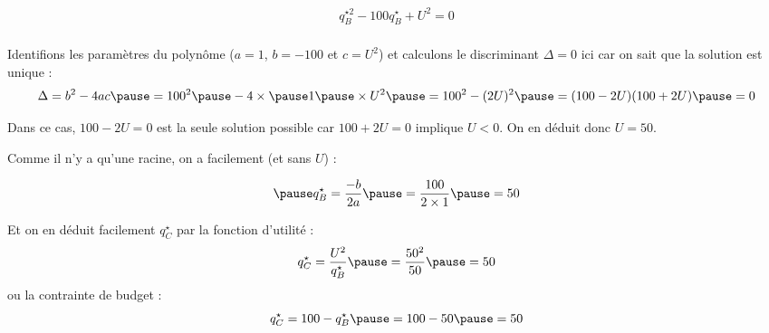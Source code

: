 \documentclass[9pt,professionalfonts,handout,hyperref]{beamer}
\begin{document}
\begin{frame}

\[\begin{aligned}
q_B^{\star 2} -100q_B^\star + U^2 = 0\\
\end{aligned}\]

\pause Identifions les paramètres du polynôme \pause ($a=1$, \pause $b=-100$ \pause et $c=U^2$) \pause et calculons le discriminant $\Delta =0$ ici car on sait que la solution est unique :
\[
\Delta = b^2 -4ac \pause = 100^2 \pause - 4 \times \pause 1 \pause \times U^2 \pause = 100^2 - (2U)^2 \pause = (100- 2U)(100+ 2U) \pause = 0
\]

\pause Dans ce cas, $100- 2U = 0$ est la seule solution possible car $100+ 2U = 0$ implique $U<0$. \pause On en déduit donc $U = 50$. \newline

\pause Comme il n'y a qu'une racine, on a facilement (et sans $U$) :

\[\begin{aligned}
\pause &q_B^\star = \frac{-b}{2a} \pause = \frac{100}{2\times1} \pause = 50\\
\end{aligned}\]

\pause Et on en déduit facilement $q_C^\star$ \pause par la fonction d'utilité : \pause $$q_C^\star= \frac{U^2}{q_B^\star} \pause = \frac{50^2}{50} \pause = 50$$ \pause ou la contrainte de budget :
$$q_C^\star = 100-q_B^\star \pause = 100-50 \pause = 50$$

\end{frame}
\end{document}
